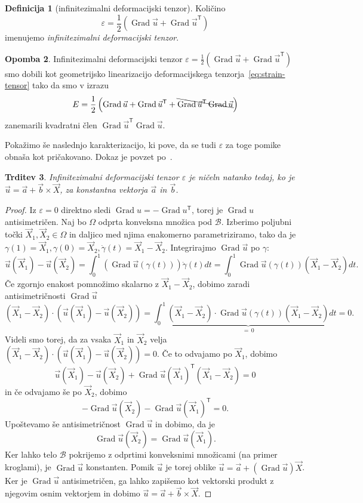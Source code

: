 \documentclass[12pt,a4paper,twoside]{article}
\theoremstyle{definition} %
\newtheorem{definicija}{Definicija}[section]
\newtheorem{opomba}[definicija]{Opomba}
\theoremstyle{plain} %
\newtheorem{trditev}[definicija]{Trditev}
\numberwithin{equation}{section}
\newcommand{\B}{\mathcal{B}}
\newcommand{\T}{\mathsf{T}}
\newcommand{\Grad}{\operatorname{Grad}}
\newcommand{\eps}{\varepsilon}
\newcommand{\vu}{\vec{u}}
\newcommand{\va}{\vec{a}}
\newcommand{\vb}{\vec{b}}
\newcommand{\vX}{\vec{X}}
\newcommand{\vXX}{\vec{X}_1}
\newcommand{\vY}{\vec{X}_2}
\begin{document}
\begin{definicija}[infinitezimalni deformacijski tenzor]
  Količino
  \begin{equation}
    \eps = \frac{1}{2}(\Grad \vu + \Grad \vu^\T)
    \label{eq:eps}
  \end{equation}
  imenujemo \emph{infinitezimalni deformacijski tenzor}.
\end{definicija}
\begin{opomba}
  \label{op:linear-strain}
  Infinitezimalni deformacijski tenzor $\eps = \frac{1}{2}(\Grad \vu + \Grad \vu^\T)$ smo dobili kot
  geometrijsko linearizacijo deformacijskega tenzorja~\eqref{eq:strain-tensor} tako da smo v izrazu
  \begin{equation}
    E = \frac12\left( \Grad \vu + \Grad \vu^\T + \bcancel{\Grad \vu^\T \Grad \vu} \right)
  \end{equation}
  zanemarili kvadratni člen $\Grad \vu^\T \Grad \vu$.
\end{opomba}

Pokažimo še naslednjo karakterizacijo, ki pove, da se tudi $\eps$ za toge pomike
obnaša kot pričakovano. Dokaz je povzet po~\cite[str.\ 56]{gurtin1982introduction}.
\begin{trditev}
  \label{trd:eps-0}
  Infinitezimalni deformacijski tenzor $\eps$ je ničeln natanko tedaj, ko je
  $\vu = \va + \vb \times \vX$, za konstantna vektorja $\va$ in $\vb$.
\end{trditev}
\begin{proof}
  Iz $\eps = 0$ direktno sledi $\Grad u = -\Grad u^\T$, torej je $\Grad u$ antisimetričen.
  Naj bo $\Omega$ odprta konveksna množica pod $\B$. Izberimo poljubni točki $\vXX, \vY \in \Omega$
  in daljico med njima enakomerno parametriziramo, tako da je $\gamma(1) = \vXX, \gamma(0) = \vY,
  \dot\gamma(t) = \vXX-\vY$. Integrirajmo $\Grad \vu$ po $\gamma$:
  \[
    \vu(\vXX) - \vu(\vY) = \int_0^1 (\Grad\vu(\gamma(t)))\dot\gamma(t)dt =
    \int_0^1\Grad\vu(\gamma(t))(\vXX-\vY) dt.
  \]
  Če zgornjo enakost pomnožimo skalarno z $\vXX-\vY$, dobimo zaradi antisimetričnosti $\Grad \vu$
  \[
    (\vXX - \vY)\cdot (\vu(\vXX) - \vu(\vY)) =
    \int_0^1\underbrace{(\vXX - \vY)\cdot \Grad\vu(\gamma(t))(\vXX-\vY)}_{=\,0} dt = 0.
  \]
  Videli smo torej, da za vsaka $\vXX$ in $\vY$ velja $(\vXX - \vY)\cdot (\vu(\vXX) - \vu(\vY)) = 0$.
  Če to odvajamo po $\vXX$, dobimo
  \[
    \vu(\vXX) - \vu(\vY) + \Grad\vu(\vXX)^\T(\vXX - \vY) = 0
  \]
  in če odvajamo še po $\vY$, dobimo
  \[
    - \Grad \vu(\vY) - \Grad\vu(\vXX)^\T = 0.
  \]
  Upoštevamo še antisimetričnost $\Grad\vu$ in dobimo, da je
  \[
    \Grad \vu(\vY) = \Grad\vu(\vXX).
  \]
  Ker lahko telo $\B$ pokrijemo z odprtimi konveksnimi množicami (na primer kroglami),
  je $\Grad\vu$ konstanten. Pomik $\vu$ je torej oblike $\vu = \va + (\Grad\vu) \vX$.
  Ker je $\Grad \vu$ antisimetričen, ga lahko zapišemo kot vektorski produkt z
  njegovim osnim vektorjem in dobimo $\vu = \va + \vb \times \vX$.
\end{proof}
\end{document}
